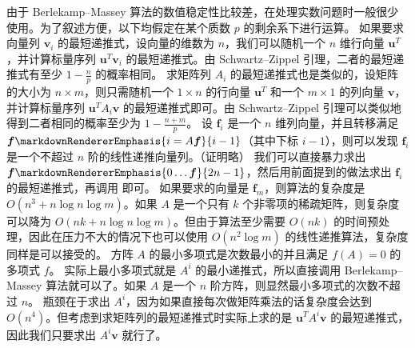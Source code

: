 {}由于 Berlekamp–Massey 算法的数值稳定性比较差，在处理实数问题时一般很少使用。为了叙述方便，以下均假定在某个质数 $p$ 的剩余系下进行运算。\markdownRendererInterblockSeparator
{}\markdownRendererSectionBegin
{}\markdownRendererInterblockSeparator
{}如果要求向量列 $\boldsymbol{v}_i$ 的最短递推式，设向量的维数为 $n$，我们可以随机一个 $n$ 维行向量 $\mathbf u^T$，并计算标量序列 ${\boldsymbol{u}^T\boldsymbol{v}_i}$ 的最短递推式。由 Schwartz–Zippel 引理，二者的最短递推式有至少 $1 - \frac n p$ 的概率相同。\markdownRendererParagraphSeparator
{}求矩阵列 ${A_i}$ 的最短递推式也是类似的，设矩阵的大小为 $n \times m$，则只需随机一个 $1 \times n$ 的行向量 $\mathbf u^T$ 和一个 $m \times 1$ 的列向量 $\boldsymbol{v}$，并计算标量序列 ${\boldsymbol{u}^T A_i \boldsymbol{v}}$ 的最短递推式即可。由 Schwartz–Zippel 引理可以类似地得到二者相同的概率至少为 $1 - \frac{n + m} p$。\markdownRendererInterblockSeparator
{}
\markdownRendererSectionEnd \markdownRendererSectionBegin
{}\markdownRendererInterblockSeparator
{}设 $\boldsymbol{f}_i$ 是一个 $n$ 维列向量，并且转移满足 $\boldsymbol{f}\markdownRendererEmphasis{i = A \boldsymbol{f}}{i-1}$（其中下标 $i-1$），则可以发现 ${\boldsymbol{f}_i}$ 是一个不超过 $n$ 阶的线性递推向量列。（证明略）\markdownRendererParagraphSeparator
{}我们可以直接暴力求出 $\boldsymbol{f}\markdownRendererEmphasis{0 \dots \boldsymbol{f}}{2n - 1}$，然后用前面提到的做法求出 ${\boldsymbol{f}_i}$ 的最短递推式，再调用  即可。\markdownRendererParagraphSeparator
{}如果要求的向量是 $\boldsymbol{f}_m$，则算法的复杂度是 $O(n^3 + n\log n \log m)$。如果 $A$ 是一个只有 $k$ 个非零项的稀疏矩阵，则复杂度可以降为 $O(nk + n\log n \log m)$。但由于算法至少需要 $O(nk)$ 的时间预处理，因此在压力不大的情况下也可以使用 $O(n^2 \log m)$ 的线性递推算法，复杂度同样是可以接受的。\markdownRendererInterblockSeparator
{}
\markdownRendererSectionEnd \markdownRendererSectionBegin
{}\markdownRendererInterblockSeparator
{}方阵 $A$ 的最小多项式是次数最小的并且满足 $f(A) = 0$ 的多项式 $f$。\markdownRendererParagraphSeparator
{}实际上最小多项式就是 ${A^i}$ 的最小递推式，所以直接调用 Berlekamp–Massey 算法就可以了。如果 $A$ 是一个 $n$ 阶方阵，则显然最小多项式的次数不超过 $n$。\markdownRendererParagraphSeparator
{}瓶颈在于求出 $A^i$，因为如果直接每次做矩阵乘法的话复杂度会达到 $O(n^4)$。但考虑到求矩阵列的最短递推式时实际上求的是 ${\boldsymbol{u}^T A^i \boldsymbol{v}}$ 的最短递推式，因此我们只要求出 $A^i \boldsymbol{v}$ 就行了。\markdownRendererParagraphSeparator
